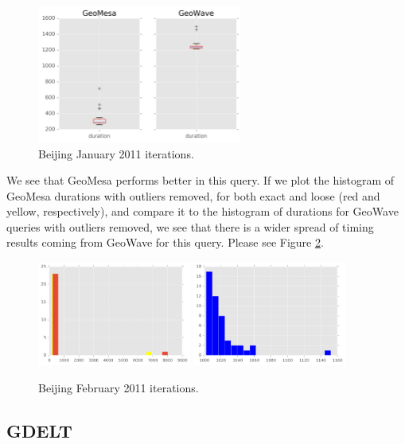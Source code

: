 \begin{figure}[h!tb]
  \centering
  \includegraphics[width=0.60\textwidth]{../docs/img/geolife-beijing-center-aug-2011.png}
  \caption{Beijing January 2011 iterations.}
  \label{beijingjan2011}
\end{figure}

We see that GeoMesa performs better in this query.
If we plot the histogram of GeoMesa durations with outliers removed,
for both exact and loose (red and yellow, respectively), and compare it to the histogram of durations for GeoWave queries with outliers removed,
we see that there is a wider spread of timing results coming from GeoWave for this query.
Please see Figure \ref{beijingfeb2011}.

\begin{figure}[h!tb]
  \centering
  \includegraphics[width=0.45\textwidth]{../docs/img/geolife-beijing-center-feb-2011-bbox-gm.png}
  \includegraphics[width=0.45\textwidth]{../docs/img/geolife-beijing-center-feb-2011-bbox-gw.png}
  \caption{Beijing February 2011 iterations.}
  \label{beijingfeb2011}
\end{figure}


\subsection{GDELT}

